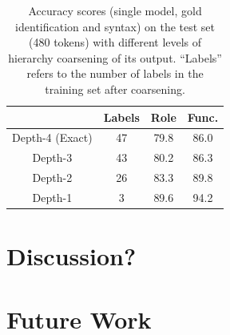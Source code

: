 \begin{table}[]
    \setlength{\tabcolsep}{10pt} %
    \renewcommand{\arraystretch}{1.5}
    \centering
    \begin{tabular}{|c|c|c|c|}
        \hline
            & Labels & Role & Func.\\ \hline
         Depth-4 (Exact) & 47 & 79.8 & 86.0\\ \hline
         Depth-3 & 43 & 80.2 & 86.3 \\ \hline
         Depth-2 & 26 & 83.3 & 89.8 \\ \hline
         Depth-1 & 3 & 89.6 & 94.2 \\ \hline
          
    \end{tabular}
    \caption{Accuracy scores (single model, gold identification and syntax) on the test set (480 tokens) with different levels of hierarchy coarsening of its output. “Labels” refers to the number of labels in the training set after coarsening.}
    \label{tab:coarsening}
\end{table}

\section{Discussion?}

\section{Future Work}

